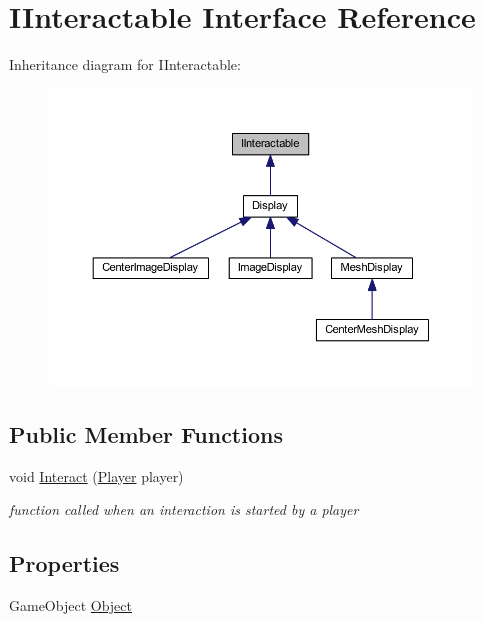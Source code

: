 \hypertarget{interface_i_interactable}{}\section{I\+Interactable Interface Reference}
\label{interface_i_interactable}


Inheritance diagram for I\+Interactable\+:
\nopagebreak
\begin{figure}[H]
\begin{center}
\leavevmode
\includegraphics[width=350pt]{interface_i_interactable__inherit__graph}
\end{center}
\end{figure}
\subsection*{Public Member Functions}
\begin{DoxyCompactItemize}
\item 
void \mbox{\hyperlink{interface_i_interactable_a736e28381ac0e7ca60f5fae2feb95afe}{Interact}} (\mbox{\hyperlink{class_player}{Player}} player)
\begin{DoxyCompactList}\small\item\em function called when an interaction is started by a player \end{DoxyCompactList}\end{DoxyCompactItemize}
\subsection*{Properties}
\begin{DoxyCompactItemize}
\item 
Game\+Object \mbox{\hyperlink{interface_i_interactable_a1ea155218acad8d933577fa071de48af}{Object}}
\end{DoxyCompactItemize}


